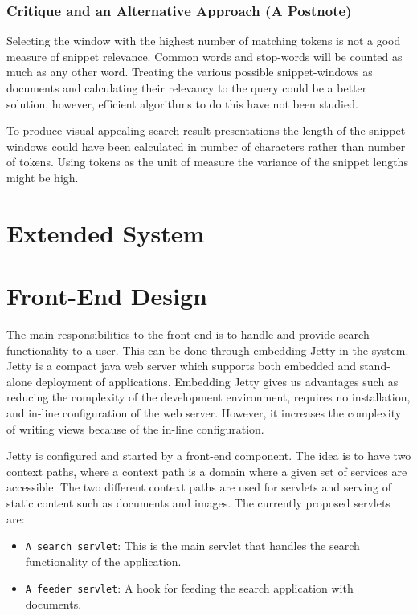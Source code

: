 \subsubsection{Critique and an Alternative Approach (A Postnote)}
Selecting the window with the highest number of matching tokens is not a good measure of snippet relevance. Common words and stop-words will be counted as much as any other word. Treating the various possible snippet-windows as documents and calculating their relevancy to the query could be a better solution, however, efficient algorithms to do this have not been studied. 

To produce visual appealing search result presentations the length of the snippet windows could have been calculated in number of characters rather than number of tokens. Using tokens as the unit of measure the variance of the snippet lengths might be high. 

\section{Extended System}

\section{Front-End Design}
The main responsibilities to the front-end is to handle and provide search functionality to a user. This can be done through embedding Jetty in the system. Jetty is a compact java web server which supports both embedded and stand-alone deployment of applications. Embedding Jetty gives us advantages such as reducing the complexity of the development environment, requires no installation, and in-line configuration of the web server. However, it increases the complexity of writing views because of the in-line configuration.

Jetty is configured and started by a front-end component. The idea is to have two context paths, where a context path is a domain where a given set of services are accessible. The two different context paths are used for servlets and serving of static content such as documents and images. The currently proposed servlets are:

\begin{itemize}
\item {\tt A search servlet}: This is the main servlet that handles the search functionality of the application.
\item {\tt A feeder servlet}: A hook for feeding the search application with documents.
\end{itemize}

